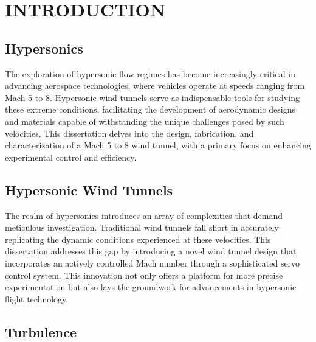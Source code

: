 %
%  
%



\pagestyle{plain} %
\setcounter{page}{1}


\chapter{INTRODUCTION}

\section{Hypersonics}

The exploration of hypersonic flow regimes has become increasingly critical in advancing aerospace technologies, where vehicles operate at speeds ranging from Mach 5 to 8. Hypersonic wind tunnels serve as indispensable tools for studying these extreme conditions, facilitating the development of aerodynamic designs and materials capable of withstanding the unique challenges posed by such velocities. This dissertation delves into the design, fabrication, and characterization of a Mach 5 to 8 wind tunnel, with a primary focus on enhancing experimental control and efficiency.

\section{Hypersonic Wind Tunnels}

The realm of hypersonics introduces an array of complexities that demand meticulous investigation. Traditional wind tunnels fall short in accurately replicating the dynamic conditions experienced at these velocities. This dissertation addresses this gap by introducing a novel wind tunnel design that incorporates an actively controlled Mach number through a sophisticated servo control system. This innovation not only offers a platform for more precise experimentation but also lays the groundwork for advancements in hypersonic flight technology.

\section{Turbulence}

